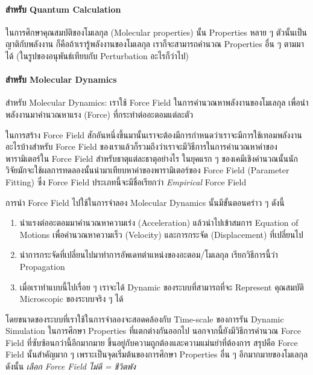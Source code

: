 \paragraph{สำหรับ Quantum Calculation}
ในการศึกษาคุณสมบัติของโมเลกุล (Molecular properties) นั้น Properties หลาย ๆ ตัวนั้นเป็นญาติกับพลังงาน ก็คือถ้าเรารู้พลังงานของโมเลกุล เราก็จะสามารถคำนวณ Properties อื่น ๆ ตามมาได้ (ในรูปของอนุพันธ์เทียบกับ Perturbation อะไรก็ว่าไป)

\paragraph{สำหรับ Molecular Dynamics}
สำหรับ Molecular Dynamics: เราใช้ Force Field ในการคำนวณหาพลังงานของโมเลกุล เพื่อนำพลังงานมาคำนวณหาแรง (Force) ที่กระทำต่ออะตอมแต่ละตัว

ในการสร้าง Force Field สักอันหนึ่งขึ้นมานั้นเราจะต้องมีการกำหนดว่าเราจะมีการใช้เทอมพลังงานอะไรบ้างสำหรับ Force Field ของเราแล้วก็รวมถึงว่าเราจะมีวิธีการในการคำนวณหาค่าของพารามิเตอร์ใน Force Field สำหรับธาตุแต่ละธาตุอย่างไร ในยุคแรก ๆ ของเคมีเชิงคำนวณนั้นนักวิจัยมักจะใช้ผลการทดลองนั้นนำมาเทียบหาค่าของพารามิเตอร์ของ Force Field (Parameter Fitting) ซึ่ง Force Field ประเภทนี้จะมีชื่อเรียกว่า
\textit{Empirical} Force Field

การนำ Force Field ไปใช้ในการจำลอง Molecular Dynamics นั้นมีขั้นตอนคร่าว ๆ ดังนี้
%
\begin{enumerate}[topsep=0pt,noitemsep]
  \setlength\itemsep{0.5em}
  \item นำแรงต่ออะตอมมาคำนวณหาความเร่ง (Acceleration) แล้วนำไปเข้าสมการ Equation of Motions เพื่อคำนวณหาความเร็ว (Velocity) และการกระจัด (Displacement) ที่เปลี่ยนไป

  \item นำการกระจัดที่เปลี่ยนไปมาทำการอัพเดทตำแหน่งของอะตอม/โมเลกุล เรียกวิธีการนี้ว่า Propagation

  \item เมื่อเราทำแบบนี้ไปเรื่อย ๆ เราจะได้ Dynamic ของระบบที่สามารถที่จะ Represent คุณสมบัติ Microscopic ของระบบจริง ๆ ได้
\end{enumerate}

โดยขนาดของระบบที่เราใช้ในการจำลองจะสอดคล้องกับ Time-scale ของการรัน Dynamic Simulation ในการศึกษา Properties ที่แตกต่างกันออกไป นอกจากนี้ยังมีวิธีการคำนวณ Force Field ที่ซับซ้อนกว่านี้อีกมากมาย ขึ้นอยู่กับความถูกต้องและความแม่นยำที่ต้องการ สรุปคือ Force Field นั้นสำคัญมาก ๆ เพราะเป็นจุดเริ่มต้นของการศึกษา Properties อื่น ๆ อีกมากมายของโมเลกุล ดังนั้น \textit{เลือก Force Field ไม่ดี = ชีวิตพัง}

